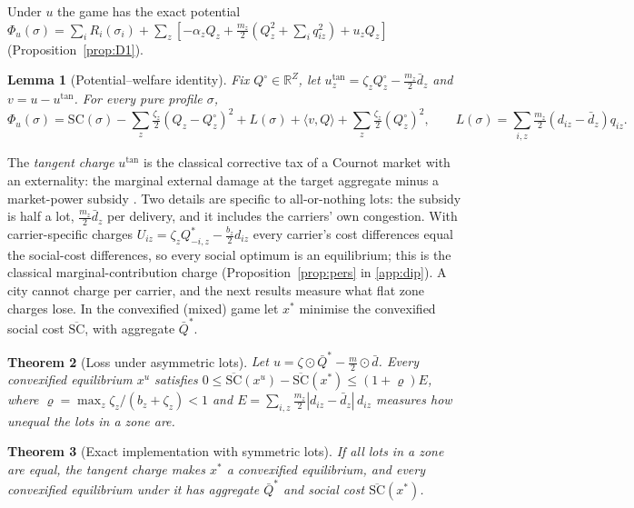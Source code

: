 \documentclass[preprint,12pt]{elsarticle}
\newtheorem{theorem}{Theorem}
\newtheorem{lemma}[theorem]{Lemma}
\theoremstyle{definition}
\theoremstyle{remark}
\newcommand{\R}{\mathbb{R}}
\newcommand{\ip}[2]{\langle #1,#2\rangle}
\begin{document}
Under $u$ the game has the exact potential $\Phi_u(\sigma)=\sum_iR_i(\sigma_i)+\sum_z[-\alpha_zQ_z+\tfrac{m_z}{2}(Q_z^2+\sum_iq_{iz}^2)+u_zQ_z]$ (Proposition~\ref{prop:D1}).

\begin{lemma}[Potential--welfare identity]\label{lem:identity}
Fix $Q^\circ\in\R^Z$, let $u^{\tan}_z=\zeta_zQ^\circ_z-\tfrac{m_z}{2}\bar d_z$ and $v=u-u^{\tan}$. For every pure profile $\sigma$,
\[
\Phi_u(\sigma)=\mathrm{SC}(\sigma)-\sum_z\tfrac{\zeta_z}{2}(Q_z-Q^\circ_z)^2+L(\sigma)+\ip{v}{Q}+\sum_z\tfrac{\zeta_z}{2}(Q^\circ_z)^2,\qquad L(\sigma)=\sum_{i,z}\tfrac{m_z}{2}(d_{iz}-\bar d_z)q_{iz}.
\]
\end{lemma}

The \emph{tangent charge} $u^{\tan}$ is the classical corrective tax of a Cournot market with an externality: the marginal external damage at the target aggregate minus a market-power subsidy \citep{Buchanan1969,Barnett1980}. Two details are specific to all-or-nothing lots: the subsidy is half a lot, $\tfrac{m_z}{2}\bar d_z$ per delivery, and it includes the carriers' own congestion. With carrier-specific charges $U_{iz}=\zeta_zQ^*_{-i,z}-\tfrac{b_z}{2}d_{iz}$ every carrier's cost differences equal the social-cost differences, so every social optimum is an equilibrium; this is the classical marginal-contribution charge \citep{Wolpert2001,Marden2013} (Proposition~\ref{prop:pers} in \ref{app:dip}). A city cannot charge per carrier, and the next results measure what flat zone charges lose. In the convexified (mixed) game let $x^*$ minimise the convexified social cost $\overline{\mathrm{SC}}$, with aggregate $\bar Q^*$.

\begin{theorem}[Loss under asymmetric lots]\label{thm:asym}
Let $u=\zeta\odot\bar Q^*-\tfrac m2\odot\bar d$. Every convexified equilibrium $x^u$ satisfies $0\le\overline{\mathrm{SC}}(x^u)-\overline{\mathrm{SC}}(x^*)\le(1+\varrho)E$, where $\varrho=\max_z\zeta_z/(b_z+\zeta_z)<1$ and $E=\sum_{i,z}\tfrac{m_z}{2}|d_{iz}-\bar d_z|\,d_{iz}$ measures how unequal the lots in a zone are.
\end{theorem}

\begin{theorem}[Exact implementation with symmetric lots]\label{thm:convex}
If all lots in a zone are equal, the tangent charge makes $x^*$ a convexified equilibrium, and every convexified equilibrium under it has aggregate $\bar Q^*$ and social cost $\overline{\mathrm{SC}}(x^*)$.
\end{theorem}
\end{document}
